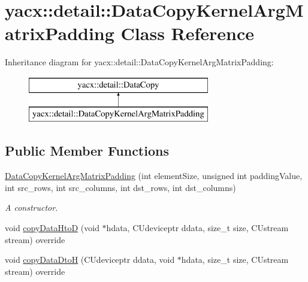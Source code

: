 \hypertarget{classyacx_1_1detail_1_1_data_copy_kernel_arg_matrix_padding}{}\section{yacx\+:\+:detail\+:\+:Data\+Copy\+Kernel\+Arg\+Matrix\+Padding Class Reference}
\label{classyacx_1_1detail_1_1_data_copy_kernel_arg_matrix_padding}
Inheritance diagram for yacx\+:\+:detail\+:\+:Data\+Copy\+Kernel\+Arg\+Matrix\+Padding\+:\begin{figure}[H]
\begin{center}
\leavevmode
\includegraphics[height=2.000000cm]{classyacx_1_1detail_1_1_data_copy_kernel_arg_matrix_padding}
\end{center}
\end{figure}
\subsection*{Public Member Functions}
\begin{DoxyCompactItemize}
\item 
\hyperlink{classyacx_1_1detail_1_1_data_copy_kernel_arg_matrix_padding_a77b442a566bffe4b5ceac055de047241}{Data\+Copy\+Kernel\+Arg\+Matrix\+Padding} (int element\+Size, unsigned int padding\+Value, int src\+\_\+rows, int src\+\_\+columns, int dst\+\_\+rows, int dst\+\_\+columns)
\begin{DoxyCompactList}\small\item\em A constructor. \end{DoxyCompactList}\item 
void \hyperlink{classyacx_1_1detail_1_1_data_copy_kernel_arg_matrix_padding_a61ebfbf622e637145db249302c230873}{copy\+Data\+HtoD} (void $\ast$hdata, C\+Udeviceptr ddata, size\+\_\+t size, C\+Ustream stream) override
\item 
void \hyperlink{classyacx_1_1detail_1_1_data_copy_kernel_arg_matrix_padding_ac76365a728b5cd0f7e2bd65051b4912e}{copy\+Data\+DtoH} (C\+Udeviceptr ddata, void $\ast$hdata, size\+\_\+t size, C\+Ustream stream) override
\end{DoxyCompactItemize}


